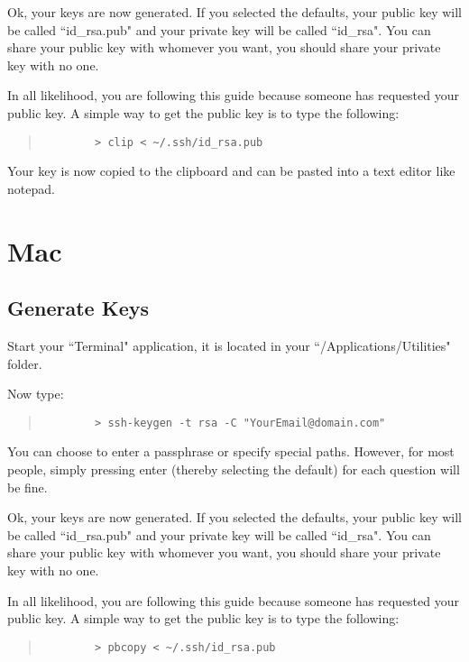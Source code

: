 \documentclass[11pt]{article}
\begin{document}
Ok, your keys are now generated.  If you selected the defaults, your public key will be called ``id\_rsa.pub" and your private key will be called ``id\_rsa".  You can share your public key with whomever you want, you should share your private key with no one.

In all likelihood, you are following this guide because someone has requested your public key.  A simple way to get the public key is to type the following:

\begin{quote}
	\begin{verbatim}
		> clip < ~/.ssh/id_rsa.pub
	\end{verbatim}
\end{quote}

Your key is now copied to the clipboard and can be pasted into a text editor like notepad.

\section{Mac}

\subsection{Generate Keys}

Start your ``Terminal" application, it is located in your ``/Applications/Utilities" folder.

Now type:

\begin{quote}
	\begin{verbatim}
		> ssh-keygen -t rsa -C "YourEmail@domain.com"
	\end{verbatim}
\end{quote}

You can choose to enter a passphrase or specify special paths.  However, for most people, simply pressing enter (thereby selecting the default) for each question will be fine.

Ok, your keys are now generated.  If you selected the defaults, your public key will be called ``id\_rsa.pub" and your private key will be called ``id\_rsa".  You can share your public key with whomever you want, you should share your private key with no one.

In all likelihood, you are following this guide because someone has requested your public key.  A simple way to get the public key is to type the following:

\begin{quote}
	\begin{verbatim}
		> pbcopy < ~/.ssh/id_rsa.pub
	\end{verbatim}
\end{quote}
\end{document}
